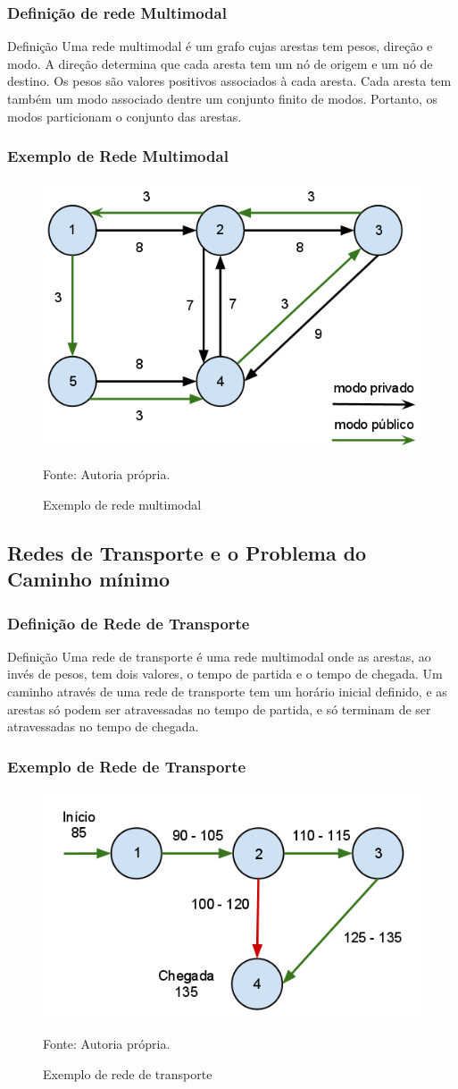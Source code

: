 \frame
{
\frametitle{Definição de rede Multimodal}
\begin{block}{Definição}
Uma rede multimodal é um grafo cujas arestas tem pesos, direção e modo. A direção determina que cada aresta tem um nó de origem e um nó de destino.
Os pesos são valores positivos associados à cada aresta. Cada aresta tem também um modo associado dentre um conjunto finito de modos. Portanto, os modos particionam o conjunto das arestas.
\end{block}
}

\frame
{
\frametitle{Exemplo de Rede Multimodal}
	\begin{figure}
		\includegraphics[width=.7\textwidth]{./imgs/multimodal.png}
		\caption{Exemplo de rede multimodal}
		\tiny
		Fonte: Autoria própria.
	\end{figure}
}

\subsection{Redes de Transporte e o Problema do Caminho mínimo}
\frame
{
\frametitle{Definição de Rede de Transporte}
\begin{block}{Definição}
Uma rede de transporte é uma rede multimodal onde as arestas, ao invés de pesos, tem dois valores, o tempo de partida e o tempo de chegada. Um caminho através de uma rede de transporte tem um horário inicial definido, e as arestas só podem ser atravessadas no tempo de partida, e só terminam de ser atravessadas no tempo de chegada.
\end{block}
}

\frame
{
\frametitle{Exemplo de Rede de Transporte}
	\begin{figure}
		\includegraphics[width=.7\textwidth]{./imgs/redetransporte.png}
		\caption{Exemplo de rede de transporte}
		\tiny
		Fonte: Autoria própria.
	\end{figure}
}

